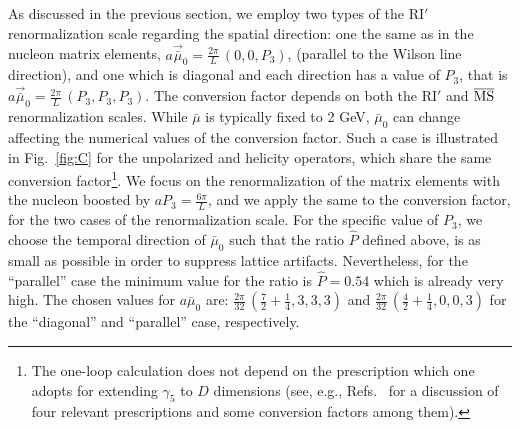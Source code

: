 \medskip
As discussed in the previous section, we employ two types of the RI$'$ renormalization scale regarding the spatial direction:
one the same as in the nucleon matrix elements, $a\vec{\bar{\mu}}_0{=}\frac{2\pi}{L}\,(0,0,P_3)$, (parallel to the Wilson line direction),
and one which is diagonal and each direction has a value of $P_3$, that is $a\vec{\bar{\mu}}_0{=}\frac{2\pi}{L}\,(P_3,P_3,P_3)$.
The conversion factor depends on both the RI$'$ and ${\overline{\rm MS}}$ renormalization scales. While $\bar\mu$ is typically fixed to 2 GeV,
$\bar\mu_0$ can change affecting the numerical values of the conversion factor. Such a case is illustrated in Fig.~\ref{fig:C}
for the unpolarized and helicity operators, which share the same conversion factor\footnote{The one-loop calculation does not
depend on the prescription which one adopts for extending $\gamma_5$ to $D$ dimensions (see, e.g.,
Refs.~\cite{Buras:1989xd,Patel:1992vu,Larin:1993tp,Larin:1993tq,Skouroupathis:2008mf,Constantinou:2013pba}
for a discussion of four relevant prescriptions and some conversion factors among them).}.
We focus on the renormalization of the matrix elements with the nucleon boosted by $a P_3{=}\frac{6\pi}{L}$, and we apply the same
to the conversion factor, for the two cases of the renormalization scale. For the specific value of $P_3$, we choose the temporal
direction of $\bar\mu_0$ such that the ratio $\hat{P}$ defined above, is as small as possible in order to suppress
lattice artifacts. Nevertheless, for the ``parallel'' case the minimum value for the ratio is $\hat{P}{=}0.54$ which is already very high.
The chosen values for $a\bar\mu_0$ are: $\frac{2\pi}{32}\, (\frac{7}{2}{+}\frac{1}{4}, 3,3,3)$ and
$\frac{2\pi}{32}\, (\frac{4}{2}{+}\frac{1}{4}, 0,0,3)$ for the ``diagonal'' and ``parallel'' case, respectively.

